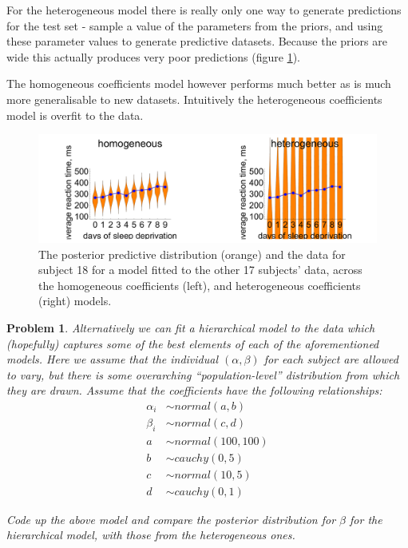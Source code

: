 \documentclass{article}
\newtheorem{problem}{Problem}[section]
\begin{document}
For the heterogeneous model there is really only one way to generate predictions for the test set - sample a value of the parameters from the priors, and using these parameter values to generate predictive datasets. Because the priors are wide this actually produces very poor predictions (figure \ref{fig:lec6_homoheteroTerrible}). 

The homogeneous coefficients model however performs much better as is much more generalisable to new datasets. Intuitively the heterogeneous coefficients model is overfit to the data.

\begin{figure}[ht]
	\centerline{\includegraphics[width=1.5\textwidth]{figures/lec6_homoheteroTerrible.pdf}}
	\caption{The posterior predictive distribution (orange) and the data for subject 18 for a model fitted to the other 17 subjects' data, across the homogeneous coefficients (left), and heterogeneous coefficients (right) models.}\label{fig:lec6_homoheteroTerrible}
\end{figure}

\begin{problem}
	Alternatively we can fit a hierarchical model to the data which (hopefully) captures some of the best elements of each of the aforementioned models. Here we assume that the individual $(\alpha,\beta)$ for each subject are allowed to vary, but there is some overarching ``population-level'' distribution from which they are drawn. Assume that the coefficients have the following relationships:
	\begin{align}
	\alpha_i &\sim normal(a,b)\\
	\beta_i &\sim normal(c,d)\\
	a &\sim normal(100,100)\\
	b &\sim cauchy(0,5)\\
	c &\sim normal(10,5)\\
	d &\sim cauchy(0,1)
	\end{align}
	
	Code up the above model and compare the posterior distribution for $\beta$ for the hierarchical model, with those from the heterogeneous ones.
\end{problem}
\end{document}
